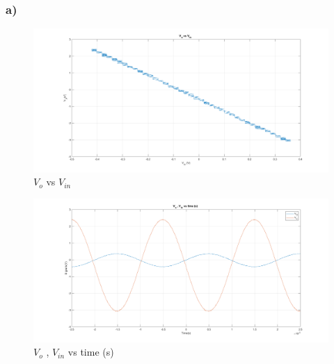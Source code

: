 \documentclass[letterpaper,12pt]{article}
\begin{document}
\subsubsection{a)}


\begin{figure}[H]
	\centering
   \includegraphics[width=1\textwidth]{1a_1.png}
   \caption{\(V_{o}\) vs \(V_{in}\)}
\end{figure}

\begin{figure}[H]
	\centering
   \includegraphics[width=1\textwidth]{1a_2.png}
   \caption{\(V_{o}\) , \(V_{in}\) vs time (s) }
\end{figure}
\end{document}
